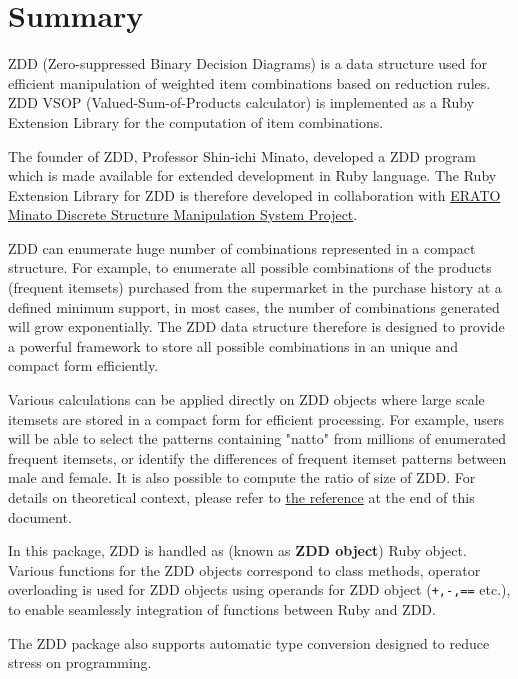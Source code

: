 %

\section{Summary\label{sect:abstract}}
ZDD (Zero-suppressed Binary Decision Diagrams) is a data structure used for efficient manipulation of weighted item combinations based on reduction rules. ZDD VSOP (Valued-Sum-of-Products calculator)\cite{minato2005} is implemented as a Ruby Extension Library for the computation of item combinations. 

The founder of ZDD, Professor Shin-ichi Minato, developed a ZDD program which is made available for extended development in Ruby language. The Ruby Extension Library for ZDD is therefore developed in collaboration with \href{http://www-erato.ist.hokudai.ac.jp/index.php?language=jp}{ERATO Minato Discrete Structure Manipulation System Project}.

ZDD can enumerate huge number of combinations represented in a compact structure. For example, to enumerate all possible combinations of the products (frequent itemsets) purchased from the supermarket in the purchase history at a defined minimum support, in most cases, the number of combinations generated will grow exponentially. The ZDD data structure therefore is designed to provide a powerful framework to store all possible combinations in an unique and compact form efficiently.

Various calculations can be applied directly on ZDD objects where large scale itemsets are stored in a compact form for efficient processing.  
For example, users will be able to select the patterns containing "natto" from millions of enumerated frequent itemsets, or identify the differences of frequent itemset patterns between male and female. It is also possible to compute the ratio of size of ZDD. For details on theoretical context, please refer to \hyperref[sect:bib]{the reference} at the end of this document.

In this package, ZDD is handled as (known as {\bf ZDD object}) Ruby object.  Various functions for the ZDD objects correspond to class methods, operator overloading is used for ZDD objects using operands for ZDD object (\verb|+,-,==| etc.), to enable seamlessly integration of functions between Ruby and ZDD.

The ZDD package also supports automatic type conversion designed to reduce stress on   programming.

